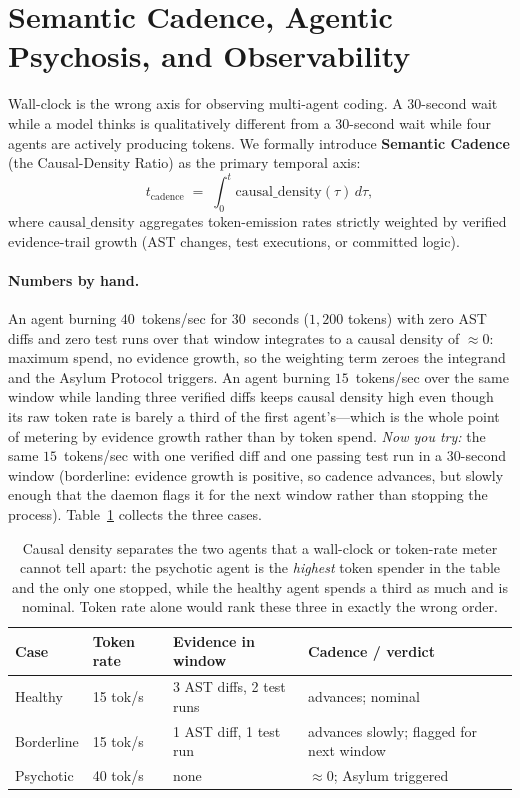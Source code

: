\documentclass[11pt,a4paper]{article}
\theoremstyle{definition}
\theoremstyle{remark}
\begin{document}
\section{Semantic Cadence, Agentic Psychosis, and Observability}\label{sec:vibe}

Wall-clock is the wrong axis for observing multi-agent coding. A 30-second wait while a model thinks is qualitatively different from a 30-second wait while four agents are actively producing tokens. We formally introduce \textbf{Semantic Cadence} (the Causal-Density Ratio) as the primary temporal axis:
\[
t_{\text{cadence}} \;=\; \int_{0}^{t} \mathrm{causal\_density}(\tau)\,d\tau,
\]
where $\mathrm{causal\_density}$ aggregates token-emission rates strictly weighted by verified evidence-trail growth (AST changes, test executions, or committed logic).

\paragraph{Numbers by hand.} An agent burning $40$~tokens/sec for $30$~seconds ($1{,}200$ tokens) with zero AST diffs and zero test runs over that window integrates to a causal density of $\approx 0$: maximum spend, no evidence growth, so the weighting term zeroes the integrand and the Asylum Protocol triggers. An agent burning $15$~tokens/sec over the same window while landing three verified diffs keeps causal density high even though its raw token rate is barely a third of the first agent's---which is the whole point of metering by evidence growth rather than by token spend. \emph{Now you try:} the same $15$~tokens/sec with one verified diff and one passing test run in a $30$-second window (borderline: evidence growth is positive, so cadence advances, but slowly enough that the daemon flags it for the next window rather than stopping the process). Table~\ref{tab:cadence-verdicts} collects the three cases.

\begin{table}[H]
\centering
\caption{Causal density separates the two agents that a wall-clock or token-rate meter cannot tell apart: the psychotic agent is the \emph{highest} token spender in the table and the only one stopped, while the healthy agent spends a third as much and is nominal. Token rate alone would rank these three in exactly the wrong order.}
\label{tab:cadence-verdicts}
\begin{tabular}{@{}llll@{}}
\toprule
\textbf{Case} & \textbf{Token rate} & \textbf{Evidence in window} & \textbf{Cadence / verdict} \\
\midrule
Healthy & 15 tok/s & 3 AST diffs, 2 test runs & advances; nominal \\
Borderline & 15 tok/s & 1 AST diff, 1 test run & advances slowly; flagged for next window \\
Psychotic & 40 tok/s & none & $\approx 0$; Asylum triggered \\
\bottomrule
\end{tabular}
\end{table}
\end{document}
